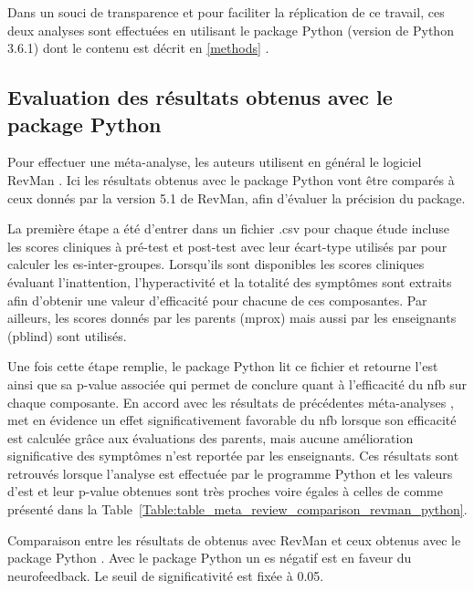 Dans un souci de transparence et pour faciliter la réplication de ce travail, ces deux analyses sont effectuées en utilisant le package Python 
(version de Python 3.6.1) dont le contenu est décrit en \ref{methods} \citep{Bussalb2019c}. 

\subsection{Evaluation des résultats obtenus avec le package Python}

Pour effectuer une méta-analyse, les auteurs utilisent en général le logiciel RevMan \citep{Revman} \citep{Cortese2016, Micoulaud2014}. Ici les résultats 
obtenus avec le package Python vont être comparés à ceux donnés par la version 5.1 de RevMan, afin d'évaluer la précision du package. 

La première étape a été d'entrer dans un fichier .csv pour chaque étude incluse les scores cliniques à pré-test et post-test avec leur écart-type utilisés 
par \citet{Cortese2016} pour calculer les \gls{es}-inter-groupes. Lorsqu'ils sont disponibles les scores cliniques évaluant l'inattention, l'hyperactivité 
et la totalité des symptômes sont extraits afin d'obtenir une valeur d'efficacité pour chacune de ces composantes. Par ailleurs, les scores donnés par les
parents (\gls{mprox}) mais aussi par les enseignants (\gls{pblind}) sont utilisés.

Une fois cette étape remplie, le package Python lit ce fichier et retourne l'\gls{est} ainsi que sa p-value associée qui permet de conclure quant à l'efficacité
du \gls{nfb} sur chaque composante. En accord avec les résultats de précédentes méta-analyses \citep{Sonuga-Barke2013, Micoulaud2014}, \citet{Cortese2016}
met en évidence un effet significativement favorable du \gls{nfb} lorsque son efficacité est calculée grâce aux évaluations des parents, mais aucune amélioration 
significative des symptômes n'est reportée par les enseignants. Ces résultats sont retrouvés lorsque l'analyse est effectuée par le programme Python et les valeurs
d'\gls{est} et leur p-value obtenues sont très proches voire égales à celles de \citet{Cortese2016} comme présenté dans la 
Table~\ref{Table:table_meta_review_comparison_revman_python}. 

\begin{table}[h!]
  \centering
  \caption{Comparaison entre les résultats de \citet{Cortese2016} obtenus avec RevMan \citep{Revman} et ceux obtenus avec le package Python \citep{Bussalb2019a}.
	Avec le package Python un \gls{es} négatif est en faveur du neurofeedback. Le seuil de significativité est fixée à 0.05.}
  
  \label{Table:table_meta_review_comparison_revman_python}
\end{table}


